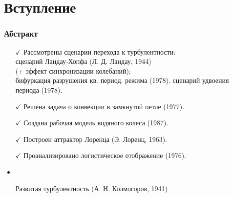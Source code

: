 \section{Вступление}

\begin{frame}

\frametitle{Абстракт}

\begin{itemize}
    \item[$\checkmark$] Рассмотрены сценарии перехода к турбулентности: \\
    \phantom{42} \hspace{0.1cm} сценарий Ландау-Хопфа (Л. Д. Ландау, 1944) \\
    \phantom{42} \hspace{0.1cm} (+ эффект синхронизации колебаний); \\
    \phantom{42} \hspace{0.1cm} бифуркация разрушения кв. период. режима (1978).
    \phantom{42} \hspace{0.1cm} сценарий удвоения периода (1978).
    \item[$\checkmark$] Решена задача о конвекции в замкнутой петле (1977).
    \item[$\checkmark$] Создана рабочая модель водяного колеса (1987). \\
    \item[$\checkmark$] Построен аттрактор Лоренца (Э. Лоренц, 1963).
    \item[$\checkmark$] Проанализировано логистическое отображение (1976).
    \item
    \item[\xmark] Развитая турбулентность (А. Н. Колмогоров, 1941)
\end{itemize}


\end{frame}